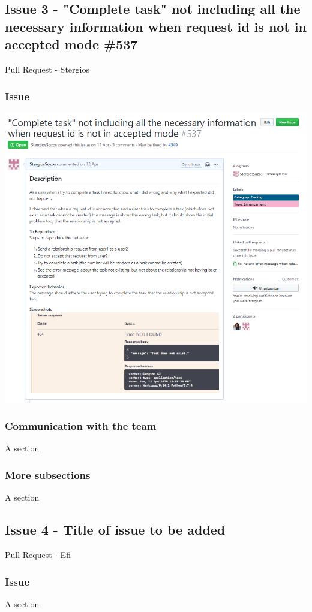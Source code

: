 \documentclass{article}
\begin{document}
\subsection{Issue 3 - "Complete task" not including all the necessary information when request id is not in accepted mode \#537}
Pull Request - Stergios

\subsubsection{Issue}
\includegraphics{issue537}

\subsubsection{Communication with the team}
A section

\subsubsection{More subsections}
A section

\subsection{Issue 4 - Title of issue to be added}
Pull Request - Efi


\subsubsection{Issue}
A section
\end{document}
